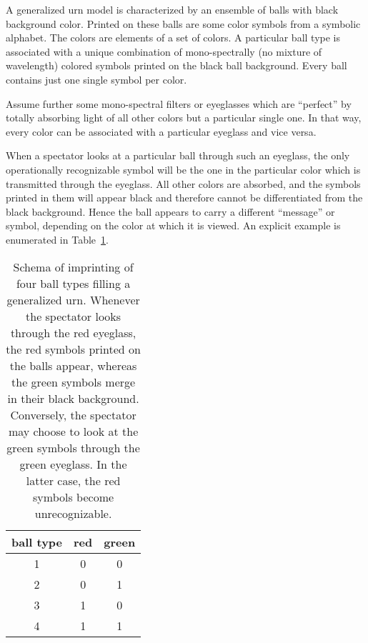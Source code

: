 \documentclass[rmp,amsfonts,showpacs,showkeys]{revtex4}
\newcommand{\Red}{\color{Red}}  %
\newcommand{\Green}{\color{Green}}  %
\begin{document}
A generalized urn model is
characterized by an ensemble of balls with black background color.
Printed on these balls are some color symbols from a symbolic alphabet.
The colors are elements of a set of colors.
A particular ball type is associated with a unique combination of mono-spectrally
(no mixture of wavelength) colored symbols
printed on the black ball background.
Every ball contains just one single symbol per color.

Assume further some mono-spectral filters or eyeglasses which are
``perfect'' by totally absorbing light of all other colors
but a particular single one.
In that way, every color can be associated with a particular eyeglass and vice versa.

When a spectator looks at a particular ball through such an eyeglass,
the only operationally recognizable symbol will be the one in the particular
color which is transmitted through the eyeglass.
All other colors are absorbed, and the symbols printed in them will appear black
and therefore cannot be differentiated from the black background.
Hence the ball appears to carry a different ``message'' or symbol,
depending on the color at which it is viewed.
An explicit example is
enumerated in Table~\ref{2005-nl1-t1}.
\begin{table}
\begin{tabular}{ccc}
\hline\hline
 \hspace{0.5 true cm} ball type \hspace{0.5 true cm} &
 \hspace{0.5 true cm} {\Red red} \hspace{0.5 true cm} &
\hspace{0.5 true cm} {\Green green} \hspace{0.5 true cm} \\
\hline
1&{\Red 0}&{\Green 0}\\
2&{\Red 0}&{\Green 1}\\
3&{\Red 1}&{\Green 0}\\
4&{\Red 1}&{\Green 1}\\
\hline\hline
\end{tabular}
\caption{Schema of imprinting of four ball types filling a generalized urn.
Whenever the spectator looks through the red eyeglass,
the red symbols printed on the balls appear, whereas the green symbols
merge in their black background.
Conversely,
the spectator may choose to look at the green symbols through
the green eyeglass. In the latter case, the red symbols become unrecognizable.
\label{2005-nl1-t1}}
\end{table}
\end{document}
